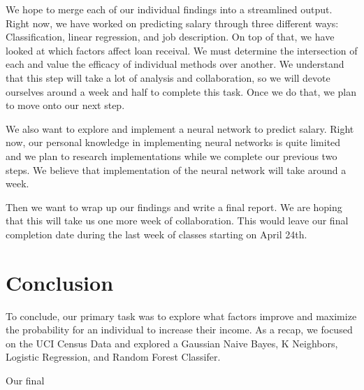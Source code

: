 \documentclass{article}
\begin{document}
We hope to merge each of our individual findings into a streamlined output. Right now, we have worked on predicting salary through three different ways: Classification, linear regression, and job description. On top of that, we have looked at which factors affect loan receival. We must determine the intersection of each and value the efficacy of individual methods over another. We understand that this step will take a lot of analysis and collaboration, so we will devote ourselves around a week and half to complete this task. Once we do that, we plan to move onto our next step. 

We also want to explore and implement a neural network to predict salary. Right now, our personal knowledge in implementing neural networks is quite limited and we plan to research implementations while we complete our previous two steps. We believe that implementation of the neural network will take around a week. 

Then we want to wrap up our findings and write a final report. We are hoping that this will take us one more week of collaboration. This would leave our final completion date during the last week of classes starting on April 24th. 

\section{Conclusion}

To conclude, our primary task was to explore what factors improve and maximize the probability for an individual to increase their income. As a recap, we focused on the UCI Census Data and explored a Gaussian Naive Bayes, K Neighbors, Logistic Regression, and Random Forest Classifer. 

Our final



\end{document}
